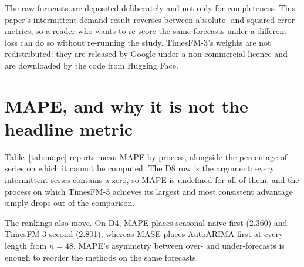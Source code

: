 \documentclass[article]{ajs}
\providecommand{\tableref}[1]{Table~\ref{#1}}
\begin{document}
The raw forecasts are deposited deliberately and not only for completeness. This paper's
intermittent-demand result reverses between absolute- and squared-error metrics, so a reader who
wants to re-score the same forecasts under a different loss can do so without re-running the
study. TimesFM-3's weights are not redistributed: they are released by Google under a
non-commercial licence and are downloaded by the code from Hugging Face.

\appendix

\section{MAPE, and why it is not the headline metric}
\label{app:mape}

\tableref{tab:mape} reports mean MAPE by process, alongside the percentage of series on which
it cannot be computed. The D8 row is the argument: every intermittent series contains a zero,
so MAPE is undefined for all of them, and the process on which TimesFM-3 achieves its largest
and most consistent advantage simply drops out of the comparison.

The rankings also move. On D4, MAPE places seasonal naive first (2.360) and TimesFM-3 second
(2.801), whereas MASE places AutoARIMA first at every length from $n = 48$. MAPE's asymmetry
between over- and under-forecasts is enough to reorder the methods on the same forecasts.




\end{document}
